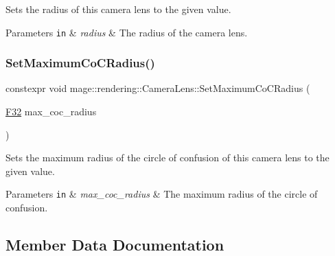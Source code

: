 Sets the radius of this camera lens to the given value.


\begin{DoxyParams}[1]{Parameters}
\mbox{\tt in}  & {\em radius} & The radius of the camera lens. \\
\hline
\end{DoxyParams}
\hypertarget{classmage_1_1rendering_1_1_camera_lens_a08305f9e891cbdc4152deccbbf287c7f}{}\label{classmage_1_1rendering_1_1_camera_lens_a08305f9e891cbdc4152deccbbf287c7f} 
\subsubsection{\texorpdfstring{Set\+Maximum\+Co\+C\+Radius()}{SetMaximumCoCRadius()}}
{\footnotesize\ttfamily constexpr void mage\+::rendering\+::\+Camera\+Lens\+::\+Set\+Maximum\+Co\+C\+Radius (\begin{DoxyParamCaption}\item[{\hyperlink{namespacemage_aa97e833b45f06d60a0a9c4fc22ae02c0}{F32}}]{max\+\_\+coc\+\_\+radius }\end{DoxyParamCaption})\hspace{0.3cm}{\ttfamily [noexcept]}}

Sets the maximum radius of the circle of confusion of this camera lens to the given value.


\begin{DoxyParams}[1]{Parameters}
\mbox{\tt in}  & {\em max\+\_\+coc\+\_\+radius} & The maximum radius of the circle of confusion. \\
\hline
\end{DoxyParams}


\subsection{Member Data Documentation}
\hypertarget{classmage_1_1rendering_1_1_camera_lens_a3459fd7d208a7ad8f1cf01718e008e36}{}\label{classmage_1_1rendering_1_1_camera_lens_a3459fd7d208a7ad8f1cf01718e008e36} 
